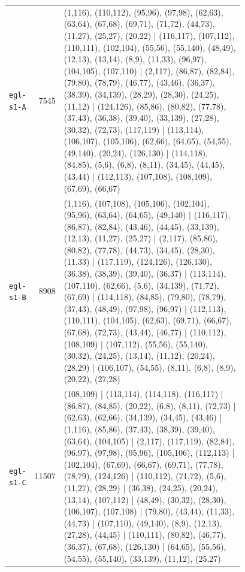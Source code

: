 \begin{landscape}
\begin{longtable}{lr>{\tiny\raggedright\arraybackslash}p{0.78\linewidth}}
\texttt{egl-s1-A} & 7545 & (1,116), (110,112), (95,96), (97,98), (62,63), (63,64), (67,68), (69,71), (71,72), (44,73), (11,27), (25,27), (20,22) | (116,117), (107,112), (110,111), (102,104), (55,56), (55,140), (48,49), (12,13), (13,14), (8,9), (11,33), (96,97), (104,105), (107,110) | (2,117), (86,87), (82,84), (79,80), (78,79), (46,77), (43,46), (36,37), (38,39), (34,139), (28,29), (28,30), (24,25), (11,12) | (124,126), (85,86), (80,82), (77,78), (37,43), (36,38), (39,40), (33,139), (27,28), (30,32), (72,73), (117,119) | (113,114), (106,107), (105,106), (62,66), (64,65), (54,55), (49,140), (20,24), (126,130) | (114,118), (84,85), (5,6), (6,8), (8,11), (34,45), (44,45), (43,44) | (112,113), (107,108), (108,109), (67,69), (66,67) \\[2pt]
\texttt{egl-s1-B} & 8908 & (1,116), (107,108), (105,106), (102,104), (95,96), (63,64), (64,65), (49,140) | (116,117), (86,87), (82,84), (43,46), (44,45), (33,139), (12,13), (11,27), (25,27) | (2,117), (85,86), (80,82), (77,78), (44,73), (34,45), (28,30), (11,33) | (117,119), (124,126), (126,130), (36,38), (38,39), (39,40), (36,37) | (113,114), (107,110), (62,66), (5,6), (34,139), (71,72), (67,69) | (114,118), (84,85), (79,80), (78,79), (37,43), (48,49), (97,98), (96,97) | (112,113), (110,111), (104,105), (62,63), (69,71), (66,67), (67,68), (72,73), (43,44), (46,77) | (110,112), (108,109) | (107,112), (55,56), (55,140), (30,32), (24,25), (13,14), (11,12), (20,24), (28,29) | (106,107), (54,55), (8,11), (6,8), (8,9), (20,22), (27,28) \\[2pt]
\texttt{egl-s1-C} & 11507 & (108,109) | (113,114), (114,118), (116,117) | (86,87), (84,85), (20,22), (6,8), (8,11), (72,73) | (62,63), (62,66), (34,139), (34,45), (43,46) | (1,116), (85,86), (37,43), (38,39), (39,40), (63,64), (104,105) | (2,117), (117,119), (82,84), (96,97), (97,98), (95,96), (105,106), (112,113) | (102,104), (67,69), (66,67), (69,71), (77,78), (78,79), (124,126) | (110,112), (71,72), (5,6), (11,27), (28,29) | (36,38), (24,25), (20,24), (13,14), (107,112) | (48,49), (30,32), (28,30), (106,107), (107,108) | (79,80), (43,44), (11,33), (44,73) | (107,110), (49,140), (8,9), (12,13), (27,28), (44,45) | (110,111), (80,82), (46,77), (36,37), (67,68), (126,130) | (64,65), (55,56), (54,55), (55,140), (33,139), (11,12), (25,27) \\[2pt]

\end{longtable}
\end{landscape}

